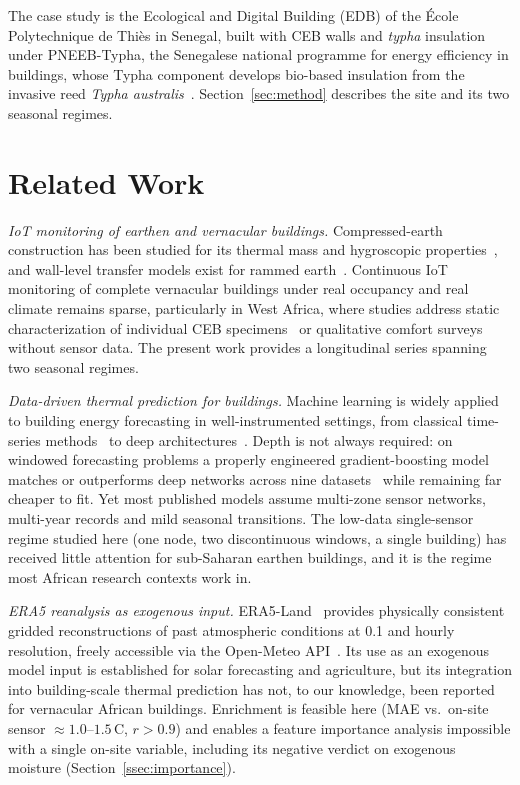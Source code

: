 \documentclass[conference]{IEEEtran}
\begin{document}
The case study is the Ecological and Digital Building (EDB) of the
École Polytechnique de Thiès in Senegal, built with CEB walls and \textit{typha}
insulation under PNEEB-Typha, the Senegalese national programme for
energy efficiency in buildings, whose Typha component develops
bio-based insulation from the invasive reed \textit{Typha
australis}~\cite{niang2018}. Section~\ref{sec:method} describes the
site and its two seasonal regimes.

\section{Related Work}
\label{sec:related}


\textit{IoT monitoring of earthen and vernacular buildings.}
Compressed-earth construction has been studied for its thermal mass and
hygroscopic properties~\cite{morel2001,liuzzi2018}, and wall-level
transfer models exist for rammed earth~\cite{soudani2017}. Continuous
IoT monitoring of complete vernacular buildings under real occupancy
and real climate remains sparse, particularly in West Africa, where
studies address static characterization of individual CEB
specimens~\cite{fabbri2014} or qualitative comfort surveys without
sensor data. The present work provides a longitudinal series spanning
two seasonal regimes.

\textit{Data-driven thermal prediction for buildings.}
Machine learning is widely applied to building energy forecasting in
well-instrumented settings, from classical time-series
methods~\cite{deb2017} to deep architectures~\cite{li2021}. Depth is
not always required: on windowed forecasting problems a properly
engineered gradient-boosting model matches or outperforms deep networks
across nine datasets~\cite{elsayed2021} while remaining far cheaper to
fit. Yet most published models assume multi-zone sensor networks,
multi-year records and mild seasonal transitions. The low-data
single-sensor regime studied here (one node, two discontinuous windows,
a single building) has received little attention for sub-Saharan
earthen buildings, and it is the regime most African research contexts
work in.

\textit{ERA5 reanalysis as exogenous input.}
ERA5-Land~\cite{muñozsabater2021} provides physically consistent
gridded reconstructions of past atmospheric conditions at
0.1\textdegree{} and hourly resolution, freely accessible via the
Open-Meteo API~\cite{zippenfenig2023}. Its use as an exogenous model
input is established for solar forecasting and agriculture, but its
integration into building-scale thermal prediction has not, to our
knowledge, been reported for vernacular African buildings. Enrichment
is feasible here (MAE vs.\ on-site sensor
${\approx}1.0$--$1.5$\,\textdegree{}C, $r>0.9$) and enables a feature
importance analysis impossible with a single on-site variable,
including its negative verdict on exogenous moisture
(Section~\ref{ssec:importance}).
\end{document}
